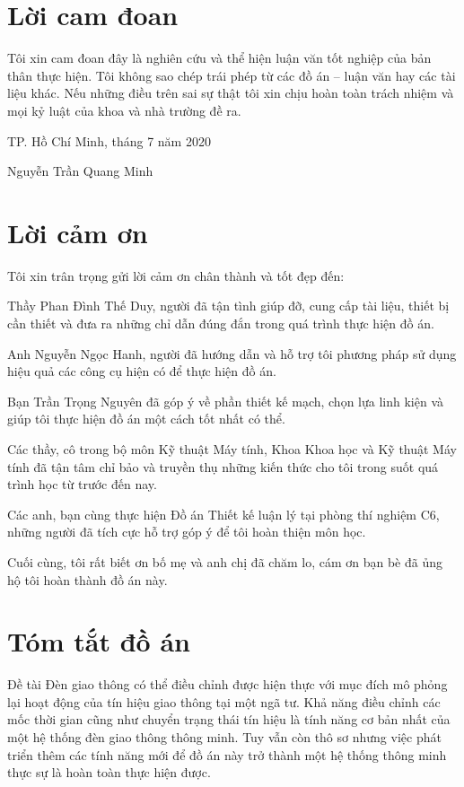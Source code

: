 \documentclass[a4paper]{article}
\begin{document}
\newpage
\section*{Lời cam đoan}
Tôi xin cam đoan đây là nghiên cứu và thể hiện luận văn tốt nghiệp của bản thân thực hiện. Tôi không sao chép trái phép từ các đồ án – luận văn hay các tài liệu khác. Nếu những điều trên sai sự thật tôi xin chịu hoàn toàn trách nhiệm và mọi kỷ luật của khoa và nhà trường đề ra.
\begin{flushright}
TP. Hồ Chí Minh, tháng 7 năm 2020

	Nguyễn Trần Quang Minh
\end{flushright}


\newpage
\section*{Lời cảm ơn}
Tôi xin trân trọng gửi lời cảm ơn chân thành và tốt đẹp đến:

Thầy Phan Đình Thế Duy, người đã tận tình giúp đỡ, cung cấp tài liệu, thiết bị cần thiết và đưa ra những chỉ dẫn đúng đắn trong quá trình thực hiện đồ án.

Anh Nguyễn Ngọc Hanh, người đã hướng dẫn và hỗ trợ tôi phương pháp sử dụng hiệu quả các công cụ hiện có để thực hiện đồ án.

Bạn Trần Trọng Nguyên đã góp ý về phần thiết kế mạch, chọn lựa linh kiện và giúp tôi thực hiện đồ án một cách tốt nhất có thể.

Các thầy, cô trong bộ môn Kỹ thuật Máy tính, Khoa Khoa học và Kỹ thuật Máy tính đã tận tâm chỉ bảo và truyền thụ những kiến thức cho tôi trong suốt quá trình học từ trước đến nay.

Các anh, bạn cùng thực hiện Đồ án Thiết kế luận lý tại phòng thí nghiệm C6, những người đã tích cực hỗ trợ góp ý để tôi hoàn thiện môn học.

Cuối cùng, tôi rất biết ơn bố mẹ và anh chị đã chăm lo, cám ơn bạn bè đã ủng hộ tôi hoàn thành đồ án này.
\newpage
\section*{Tóm tắt đồ án}
Đề tài Đèn giao thông có thể điều chỉnh được hiện thực với mục đích mô phỏng lại hoạt động của tín hiệu giao thông tại một ngã tư. Khả năng điều chỉnh các mốc thời gian cũng như chuyển trạng thái tín hiệu là tính năng cơ bản nhất của một hệ thống đèn giao thông thông minh. Tuy vẫn còn thô sơ nhưng việc phát triển thêm các tính năng mới để đồ án này trở thành một hệ thống thông minh thực sự là hoàn toàn thực hiện được.
\end{document}
